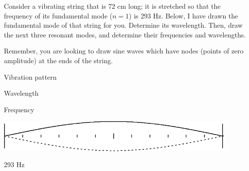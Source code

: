 \documentclass[12pt]{article}
\begin{document}
\Large
\centerline{}
\normalsize
\centerline{}

Consider a vibrating string that is 72 cm long; it is stretched so that the frequency of its fundamental mode ($n=1$) is 293 Hz. Below, I have drawn the fundamental mode of that string for you. Determine its wavelength. Then, draw the next three resonant modes, and determine their frequencies and wavelengths.

Remember, you are looking to draw sine waves which have nodes (points of zero amplitude) at the ends of the string.
\vspace{0.5in}


\begin{minipage}{0.6\textwidth}
	\begin{center}
\Large		Vibration pattern
	\end{center}
\end{minipage}
\begin{minipage}{0.2\textwidth}
	\Large \begin{center}Wavelength\end{center}
\end{minipage}
\begin{minipage}{0.2\textwidth}
\Large	\begin{center}Frequency\end{center}
\end{minipage}


\begin{minipage}{0.6\textwidth}
	\begin{center}
\includegraphics[width=0.9\textwidth]{fund-crop.pdf}
	\end{center}
\end{minipage}
\begin{minipage}{0.2\textwidth}
\hspace{0.5in}
\end{minipage}
\begin{minipage}{0.2\textwidth}
\begin{center}
	\Large 293 Hz
\end{center}	
\end{minipage}
\end{document}

